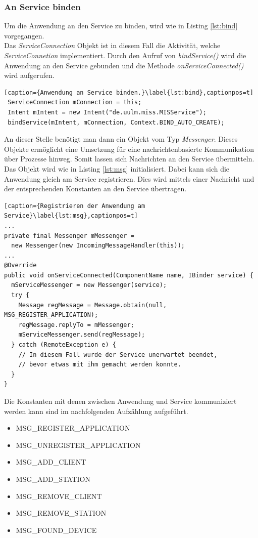 \documentclass[]{report}
\begin{document}
\subsubsection{An Service binden}
Um die Anwendung an den Service zu binden, wird wie in Listing \ref{lst:bind} vorgegangen.\\ Das \textit{ServiceConnection} Objekt ist in diesem Fall die Aktivität, welche \textit{ServiceConnetion} implementiert. Durch den Aufruf von \textit{bindService()} wird die Anwendung an den Service gebunden und die Methode \textit{onServiceConnected()} wird aufgerufen. 
\begin{lstlisting}[caption={Anwendung an Service binden.}\label{lst:bind},captionpos=t] 
 ServiceConnection mConnection = this;
 Intent mIntent = new Intent("de.uulm.miss.MISService");
 bindService(mIntent, mConnection, Context.BIND_AUTO_CREATE);
 \end{lstlisting}
 An dieser Stelle benötigt man dann ein Objekt vom Typ \textit{Messenger}. Dieses Objekte ermöglicht eine Umsetzung für eine nachrichtenbasierte Kommunikation über Prozesse hinweg. Somit lassen sich Nachrichten an den Service übermitteln. Das Objekt wird wie in Listing \ref{lst:msg} initialisiert. Dabei kann sich die Anwendung gleich am Service registrieren. Dies wird mittels einer Nachricht und der entsprechenden Konstanten an den Service übertragen. 
\begin{lstlisting}[caption={Registrieren der Anwendung am Service}\label{lst:msg},captionpos=t] 
...
private final Messenger mMessenger = 
  new Messenger(new IncomingMessageHandler(this));
...
@Override
public void onServiceConnected(ComponentName name, IBinder service) {
  mServiceMessenger = new Messenger(service);
  try {
    Message regMessage = Message.obtain(null, MSG_REGISTER_APPLICATION);
    regMessage.replyTo = mMessenger;
    mServiceMessenger.send(regMessage);
  } catch (RemoteException e) {
 	// In diesem Fall wurde der Service unerwartet beendet,
 	// bevor etwas mit ihm gemacht werden konnte.
  }
}
\end{lstlisting}
 Die Konstanten mit denen zwischen Anwendung und Service kommuniziert werden kann sind im nachfolgenden Aufzählung aufgeführt.
\begin{itemize}
\item MSG\_REGISTER\_APPLICATION
\item MSG\_UNREGISTER\_APPLICATION
\item MSG\_ADD\_CLIENT
\item MSG\_ADD\_STATION
\item MSG\_REMOVE\_CLIENT
\item MSG\_REMOVE\_STATION
\item MSG\_FOUND\_DEVICE
 \end{itemize}
\end{document}
